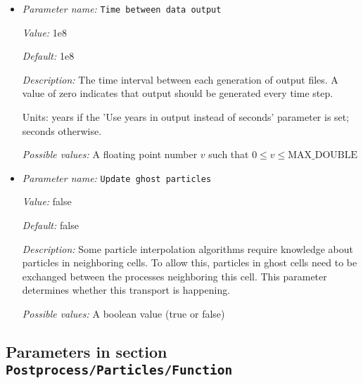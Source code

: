 \begin{itemize}
{\it Possible values:} An integer $n$ such that $0\leq n \leq 2147483647$
\item {\it Parameter name:} {\tt Time between data output}
\label{parameters:Postprocess/Particles/Time between data output}


{\it Value:} 1e8


{\it Default:} 1e8


{\it Description:} The time interval between each generation of output files. A value of zero indicates that output should be generated every time step.

Units: years if the 'Use years in output instead of seconds' parameter is set; seconds otherwise.


{\it Possible values:} A floating point number $v$ such that $0 \leq v \leq \text{MAX\_DOUBLE}$
\item {\it Parameter name:} {\tt Update ghost particles}
\label{parameters:Postprocess/Particles/Update ghost particles}


{\it Value:} false


{\it Default:} false


{\it Description:} Some particle interpolation algorithms require knowledge about particles in neighboring cells. To allow this, particles in ghost cells need to be exchanged between the processes neighboring this cell. This parameter determines whether this transport is happening.


{\it Possible values:} A boolean value (true or false)
\end{itemize}



\subsection{Parameters in section \tt Postprocess/Particles/Function}
\label{parameters:Postprocess/Particles/Function}

